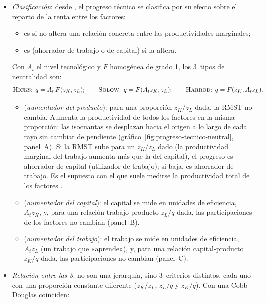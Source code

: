 \documentclass[11pt]{article}
\begin{document}
\begin{itemize}
\item \emph{Clasificación}: desde \textcite{Hicks1932Theory}, el progreso técnico se clasifica por su efecto sobre el reparto de la renta entre los factores:
  \begin{itemize}
  \item es  si no altera una relación concreta entre las productividades marginales;
  \item es  (ahorrador de trabajo o de capital) si la altera.
  \end{itemize}
  Con $A_t$ el nivel tecnológico y $F$ homogénea de grado 1, los 3~tipos de neutralidad son:
  \begin{equation}
  \text{\textsc{Hicks}: }q=A_t\,F(z_K,z_L);\qquad \text{\textsc{Solow}: }q=F(A_tz_K,z_L);\qquad \text{\textsc{Harrod}: }q=F(z_K,A_tz_L). \label{eq:neutralidad}
  \end{equation}
  \begin{itemize}
  \item {} (\emph{aumentador del producto}): para una proporción $z_K/z_L$ dada, la RMST no cambia. Aumenta la productividad de todos los factores en la misma proporción: las isocuantas se desplazan hacia el origen a lo largo de cada rayo sin cambiar de pendiente (gráfico~\ref{fig:progreso-tecnico-neutral}, panel~A). Si la RMST sube para un $z_K/z_L$ dado (la productividad marginal del trabajo aumenta más que la del capital), el progreso es ahorrador de capital (utilizador de trabajo); si baja, es ahorrador de trabajo. Es el supuesto con el que suele medirse la productividad total de los factores .
  \item {} (\emph{aumentador del capital}): el capital se mide en unidades de eficiencia, $A_tz_K$, y, para una relación trabajo-producto $z_L/q$ dada, las participaciones de los factores no cambian (panel~B).
  \item {} (\emph{aumentador del trabajo}): el trabajo se mide en unidades de eficiencia, $A_tz_L$ (un trabajo que «aprende»), y, para una relación capital-producto $z_K/q$ dada, las participaciones no cambian (panel~C)\nocite{Harrod1948Towards}.
  \end{itemize}
\item \emph{Relación entre las 3}: no son una jerarquía, sino 3~criterios distintos, cada uno con una proporción constante diferente ($z_K/z_L$, $z_L/q$ y $z_K/q$). Con una Cobb-Douglas coinciden:

\end{itemize}
\end{document}
